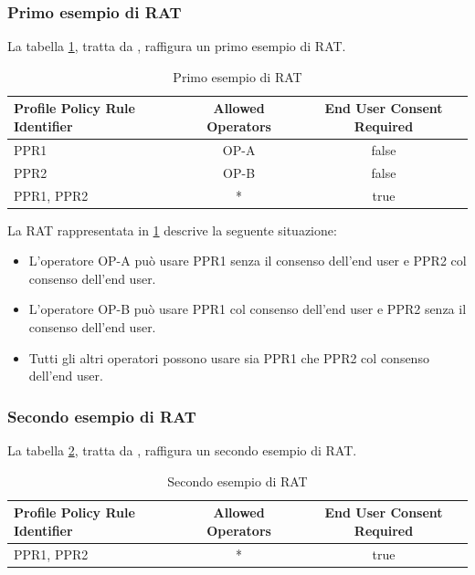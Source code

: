 \documentclass[10pt, oneside]{book}
\begin{document}
\subsubsection{Primo esempio di RAT}
La tabella \ref{tab:rat1}, tratta da \cite{GSMA-docs-new}, raffigura un primo esempio di RAT.\\
\begin{table}[h!]
\begin{center}
\captionsetup{skip=4pt}
\caption{Primo esempio di RAT}
\label{tab:rat1}
\begin{tabularx}{\textwidth}{|X|c|c|} %
\hline
\textbf{Profile Policy Rule Identifier} & \textbf{Allowed Operators} & \textbf{End User Consent Required}\\
\hline
PPR1 & OP-A & false\\
\hline
PPR2 & OP-B & false\\
\hline
PPR1, PPR2 & * & true\\
\hline
\end{tabularx}
\end{center}
\end{table}

La RAT rappresentata in \ref{tab:rat1} descrive la seguente situazione:
\begin{itemize}
\item L'operatore OP-A può usare PPR1 senza il consenso dell'end user e PPR2 col consenso dell'end user.
\item L'operatore OP-B può usare PPR1 col consenso dell'end user e PPR2 senza il consenso dell'end user.
\item Tutti gli altri operatori possono usare sia PPR1 che PPR2 col consenso dell'end user.
\end{itemize}

\subsubsection{Secondo esempio di RAT}
La tabella \ref{tab:rat2}, tratta da \cite{GSMA-docs-new}, raffigura un secondo esempio di RAT.\\
\begin{table}[h!]
\begin{center}
\captionsetup{skip=4pt}
\caption{Secondo esempio di RAT}
\label{tab:rat2}
\begin{tabularx}{\textwidth}{|X|c|c|} %
\hline
\textbf{Profile Policy Rule Identifier} & \textbf{Allowed Operators} & \textbf{End User Consent Required}\\
\hline
PPR1, PPR2 & * & true\\
\hline
\end{tabularx}
\end{center}
\end{table}
\end{document}

